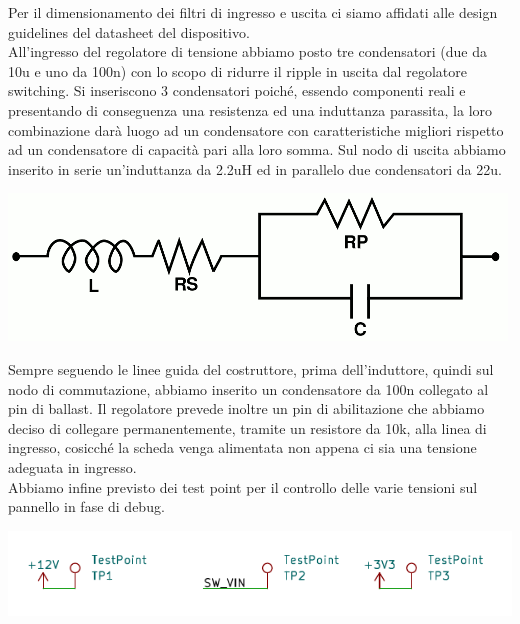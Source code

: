 \noindent Per il dimensionamento dei filtri di ingresso e uscita ci siamo affidati alle 
design guidelines del datasheet del dispositivo.\\
All'ingresso del regolatore di tensione abbiamo posto tre condensatori
(due da 10u e uno da 100n) con lo scopo di ridurre il ripple in uscita dal regolatore switching. 
Si inseriscono 3 condensatori poiché, essendo
componenti reali e presentando di conseguenza una resistenza ed una
induttanza parassita, la loro combinazione darà luogo ad un condensatore
con caratteristiche migliori rispetto ad un condensatore di capacità
pari alla loro somma.
Sul nodo di uscita abbiamo inserito in serie 
un’induttanza da 2.2uH ed in parallelo due condensatori da 22u.

\begin{center}
\includegraphics[scale=0.6]{figures/image37.png}
\captionsetup{type=figure}
\end{center}

\noindent Sempre seguendo le linee guida del costruttore, prima dell’induttore, 
quindi sul nodo di commutazione, abbiamo inserito un condensatore da 100n collegato al pin di ballast.
Il regolatore prevede inoltre un pin di abilitazione che abbiamo deciso di collegare permanentemente, 
tramite un resistore da 10k, alla linea di ingresso, cosicché la scheda venga alimentata non appena ci 
sia una tensione adeguata in ingresso.\\
Abbiamo infine previsto dei test point per il controllo delle varie
tensioni sul pannello in fase di debug.

\begin{center}
\includegraphics[scale=0.95]{figures/image78.png}
\captionsetup{type=figure}
\end{center}

